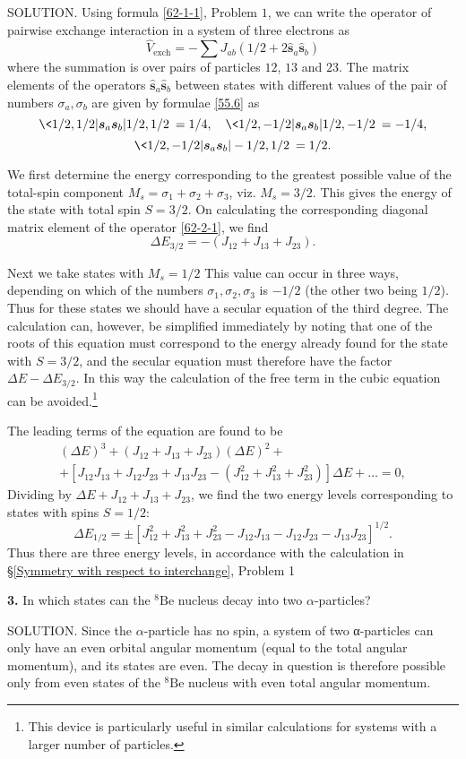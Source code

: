 {SOLUTION. Using formula \eqref{62-1-1}, Problem $ 1 $, we can write the operator of pairwise exchange interaction in a system of three electrons as
\begin{equation}\label{62-2-1}
\hat{V}_{\text{exch}}=-\sum J_{ab}(1/2+2\hat{\bm{s}}_a\hat{\bm{s}}_b)\tag{1}
\end{equation}
where the summation is over pairs of particles $ 12 $, $ 13 $ and $ 23 $. The matrix elements of the operators $ \hat{\bm{s}}_a\hat{\bm{s}}_b $ between states with different values of the pair of numbers $ \sigma_a, \sigma_b $ are given by formulae \eqref{55.6} as
\[ \<1/2,1/2|\bm{s}_a\bm{s}_b|1/2,1/2\>=1/4,\quad\<1/2,-1/2|\bm{s}_a\bm{s}_b|1/2,-1/2\>=-1/4, \]
\[ \<1/2,-1/2|\bm{s}_a\bm{s}_b|-1/2,1/2\>=1/2. \]


We first determine the energy corresponding to the greatest possible value of the total-spin component $ M_s = \sigma_1+\sigma_2+\sigma_3 $, viz. $ M_s = 3/2 $. This gives the energy of the state with total spin $ S = 3/2 $. On calculating the corresponding diagonal matrix element of the operator \eqref{62-2-1}, we find
\[ \Delta E_{3/2}=-(J_{12}+J_{13}+J_{23}). \]



Next we take states with $ M_s = 1/2 $ This value can occur in three ways, depending on which of the numbers $ \sigma_1, \sigma_2, \sigma_3 $ is $ -1/2 $ (the other two being $ 1/2 $). Thus for these states we should have a secular equation of the third degree. The calculation can, however, be simplified immediately by noting that one of the roots of this equation must correspond to the energy already found for the state with $ S = 3/2 $, and the secular equation must therefore have the factor $ \Delta E-\Delta E_{3/2} $. In this way the calculation of the free term in the cubic equation can be avoided.\footnote{This device is particularly useful in similar calculations for systems with a larger number of particles.
}

The leading terms of the equation are found to be
\begin{multline*}
(\Delta E)^3+(J_{12}+J_{13}+J_{23})(\Delta E)^2+\\
+ [J_{12}J_{13}+J_{12}J_{23}+J_{13}J_{23}-(J_{12}^2+J_{13}^2+J_{23}^2)]\Delta E+\dots=0,
\end{multline*}
Dividing by $ \Delta E+J_{12}+J_{13}+J_{23} $, we find the two energy levels corresponding to states with spins $ S =1/2  $:
\[ \Delta E_{1/2}=\pm[J_{12}^2+J_{13}^2+J_{23}^2-J_{12}J_{13}-J_{12}J_{23}-J_{13}J_{23}]^{1/2}. \]
Thus there are three energy levels, in accordance with the calculation in \S\ref{Symmetry with respect to interchange}, Problem 1





\textbf{3.} In which states can the $ {}^8\mathrm{Be} $ nucleus decay into two $\alpha$-particles?





SOLUTION. Since the $\alpha$-particle has no spin, a system of two α-particles can only have an even orbital angular momentum (equal to the total angular momentum), and its states are even. The decay in question is therefore possible only from even states of the $ {}^8\mathrm{Be} $ nucleus with even total angular momentum.}
